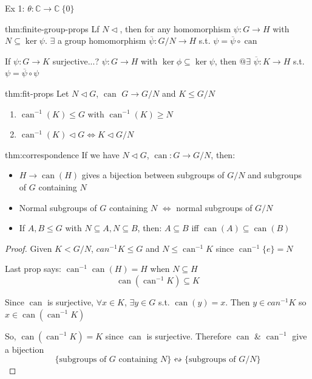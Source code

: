\documentclass{article}
\DeclareMathOperator{\can}{can}
\begin{document}
Ex 1: $\theta : \mathbb{C} \to \mathbb{C} \ \{0\}$

\begin{thm}{thm:finite-group-props}{}
    Lf $N \triangleleft$, then for any homomorphism $\psi : G \to H$ with $N \subseteq \ker \psi$. $\exists$ a group homomorphism $\overline{\psi} : G /N \to H$ s.t. $\psi = \overline{\psi} \circ \can$

    \longrule{0.08ex}

    If $\psi : G \to K$ surjective...? $\psi : G \to H$ with $\ker \phi \subseteq \ker \psi$, then $@\exists$ $\overline{\psi} : K \to H$ s.t. $\psi = \overline{\psi} \circ \psi$
\end{thm}

\begin{thm}[]{thm:fit-props}{}
    Let $N \triangleleft G$, $\can$ $G \to G /N$ and $K \le G /N$
    \begin{enumerate}
        \item $\can^{-1}(K) \le G$ with $\can^{-1}(K) \ge N$
        \item $\can^{-1}(K) \triangleleft G \iff K \triangleleft G /N$
    \end{enumerate}
\end{thm}

\begin{thm}{thm:correspondence}{}
    If we have $N \triangleleft G$, $\can : G \to G /N$, then:
    \begin{itemize}
        \item $H \to \can(H)$ gives a bijection between subgroups of $G /N$ and subgroups of $G$ containing $N$
        \item Normal subgroups of $G$ containing $N$ $\iff$ normal subgroups of $G /N$
        \item If $A, B \le G$ with $N \subseteq A, N \subseteq B$, then: $A \subseteq B$ iff $\can(A) \subseteq \can(B)$
    \end{itemize}
\end{thm}

\begin{proof}
    Given $K < G /N$, $can^{-1} K \le G$ and $N \le \can^{-1} K$ since $\can^{-1}\{e\} = N$

    Last prop says: $\can^{-1} \can (H) = H$ when $N \subseteq H$
    \[\can(\can^{-1} K) \subseteq K\]

    Since $\can$ is surjective, $\forall x\in K$, $\exists y\in G$ s.t. $\can(y) = x$. Then $y\in can^{-1} K$ so $x\in \can(\can^{-1} K)$

    So, $\can(\can^{-1} K) = K$ since $\can$ is surjective. Therefore $\can$ \& $\can^{-1}$ give a bijection
    \[\{\text{subgroups of $G$ containing $N$}\} \leftrightsquigarrow \{\text{subgroups of $G /N$}\}\]
\end{proof}
\end{document}
